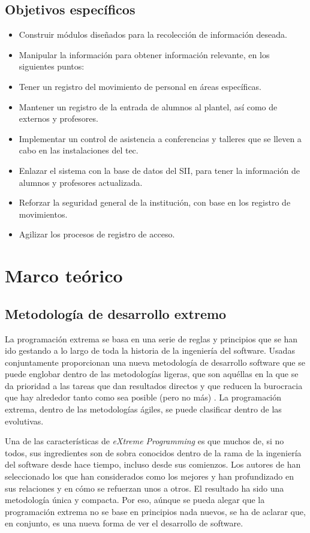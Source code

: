\documentclass[12pt]{article} %
\begin{document}
	
	\subsection{Objetivos específicos}
		\begin{itemize}
			\item Construir módulos diseñados para la recolección de información deseada.
			\item Manipular la información para obtener información relevante, en los siguientes puntos:
			\item Tener un registro del movimiento de personal en áreas específicas.
			\item Mantener un registro de la entrada de alumnos al plantel, así como de externos y profesores.
			\item Implementar un control de asistencia a conferencias y talleres que se lleven a cabo en las instalaciones del \gls{tec}.
			\item Enlazar el sistema con la base de datos del \gls{SII}, para tener la información de alumnos y profesores actualizada.
			\item Reforzar la seguridad general de la institución, con base en los registro de movimientos.
			\item Agilizar los procesos de registro de acceso.
		\end{itemize}
		

 	\newpage
 	
\section{Marco teórico}

	\subsection{Metodología de desarrollo extremo \label{XP}}
		La programación extrema se basa en una serie de reglas y principios que se han ido gestando a lo largo de toda la historia de la ingeniería del software. Usadas
		conjuntamente proporcionan una nueva metodología de desarrollo software que se puede englobar dentro de las metodologías ligeras, que son aquéllas en la que se da
		prioridad a las tareas que dan resultados directos y que reducen la burocracia que hay alrededor tanto como sea posible (pero no más) .
		La programación extrema, dentro de las metodologías ágiles, se puede clasificar dentro de las evolutivas.
		
		Una de las características de \textsl{eXtreme Programming} es que muchos de, si no todos, sus ingredientes son de sobra conocidos dentro de la rama de la ingeniería del
		software desde hace tiempo, incluso desde sus comienzos. Los autores de han seleccionado los que han considerados como los mejores y han profundizado en sus relaciones y
		en cómo se refuerzan unos a otros. El resultado ha sido una metodología única y compacta. Por eso, a\'unque se pueda alegar que la programación extrema no se base en
		principios nada nuevos, se ha de aclarar que, en conjunto, es una nueva forma de ver el desarrollo de software. 
		
\end{document}
